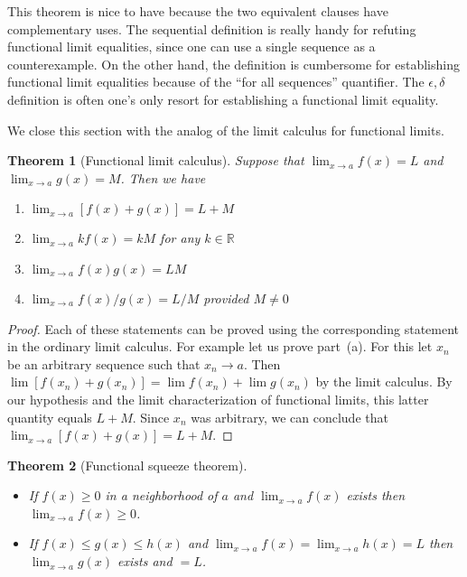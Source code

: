 \documentclass[11pt,oneside]{amsbook}
\newcommand{\RR}{\mathbb R}
\theoremstyle{definition}
\theoremstyle{plain}
\newtheorem{thm}{Theorem}[section]
\theoremstyle{definition}
\theoremstyle{remark}
\numberwithin{equation}{section}
\numberwithin{figure}{section}
\begin{document}
This theorem is nice to have because the two equivalent clauses have complementary uses. The sequential definition is really handy for refuting functional limit equalities, since one can use a single sequence as a counterexample. On the other hand, the definition is cumbersome for establishing functional limit equalities because of the ``for all sequences'' quantifier. The $\epsilon,\delta$ definition is often one's only resort for establishing a functional limit equality.

We close this section with the analog of the limit calculus for functional limits.

\begin{thm}[Functional limit calculus]
  Suppose that $\lim_{x\to a}f(x)=L$ and $\lim_{x\to a}g(x)=M$. Then we have
  \begin{enumerate}
  \item $\displaystyle\lim_{x\to a}[f(x)+g(x)]=L+M$
  \item $\displaystyle\lim_{x\to a}kf(x)=kM$ for any $k\in\RR$
  \item $\displaystyle\lim_{x\to a}f(x)g(x)=LM$
  \item $\displaystyle\lim_{x\to a}f(x)/g(x)=L/M$ provided $M\neq 0$
  \end{enumerate}
\end{thm}

\begin{proof}
  Each of these statements can be proved using the corresponding statement in the ordinary limit calculus. For example let us prove part~(a). For this let $x_n$ be an arbitrary sequence such that $x_n\to a$. Then $\lim[f(x_n)+g(x_n)]=\lim f(x_n)+\lim g(x_n)$ by the limit calculus. By our hypothesis and the limit characterization of functional limits, this latter quantity equals $L+M$. Since $x_n$ was arbitrary, we can conclude that $\lim_{x\to a}[f(x)+g(x)]=L+M$.
\end{proof}

\begin{thm}[Functional squeeze theorem]\
  \begin{itemize}
  \item If $f(x)\geq0$ in a neighborhood of $a$ and $\lim_{x\to a}f(x)$ exists then $\lim_{x\to a}f(x)\geq0$.
  \item If $f(x)\leq g(x)\leq h(x)$ and $\lim_{x\to a}f(x)=\lim_{x\to a}h(x)=L$ then $\lim_{x\to a}g(x)$ exists and $=L$.
  \end{itemize}
\end{thm}
\end{document}
